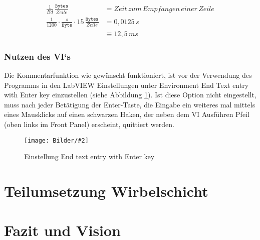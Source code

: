 \documentclass[
fontsize=12pt, 
paper=a4, 
BCOR=10mm, 
twoside=false,
 DIV=10, 
 headsepline, 
 footsepline
 ]{scrartcl}
\def\bild#1#2#3#4#5#6{%
\begin{figure}[h!] %
\centering
\texttt{[image: Bilder/\#2]}
\vspace{#3}
\caption[#4]{#5}\label{#6}
\end{figure}
}
\begin{document}
\begin{align*}
\frac{1}{Bd} \, \frac{\texttt{Bytes}}{Zeile} &= Zeit \, zum \, Empfangen \, einer \, Zeile  \\ 
\frac{1}{1200} \cdot \frac{s}{\texttt{Byte}} \cdot 15 \,  \frac{\texttt{Bytes}}{Zeile} &= 0,0125 \, s \\
&\equiv 12,5 \, ms
\end{align*}

\subsubsection{Nutzen des VI`s}

Die Kommentarfunktion wie gewünscht funktioniert, ist vor der Verwendung des Programms in den LabVIEW Einstellungen unter Environment \glqq End Text entry with Enter key\grqq{} einzustellen (siehe Abbildung \ref{endtextentry}). Ist diese Option nicht eingestellt, muss nach jeder Betätigung der Enter-Taste, die Eingabe ein weiteres mal mittels eines Mausklicks auf einen schwarzen Haken, der neben dem VI Ausführen Pfeil (oben links im Front Panel) erscheint, quittiert werden.




\bild{0.7}
{LabVIEW_serialport/endtextentry.png}
{0em}
{Einstellung \glqq End text entry with Enter key\grqq{}}
{Einstellung \glqq End text entry with Enter key\grqq{}}
{endtextentry}



\section{Teilumsetzung Wirbelschicht}



\section{Fazit und Vision}



\pagebreak
\printbibliography
%


\newpage

\listoffigures
\listoftables

\pagebreak

\end{document}
